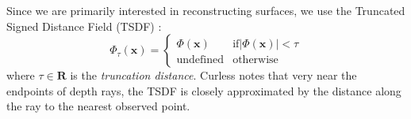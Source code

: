 \documentclass[10pt,twocolumn,letterpaper]{article}
\newcommand{\eref}[1]{(\ref{#1})}
\newcommand{\figref}[1]{Fig.\ref{#1}}
\begin{document}
Since we are primarily interested in reconstructing surfaces,
we use the Truncated Signed Distance Field (TSDF) \cite{Curless1996}:
\begin{equation}
	\Phi_{\tau}(\mathbf{x}) =
	\begin{cases}
		\Phi(\mathbf{x}) &  \text{if} |\Phi(\mathbf{x})| < \tau \\
		\text{undefined} & \text{otherwise}
	\end{cases}
\end{equation}
where $\tau \in \mathbf{R}$ is the \emph{truncation distance}.  Curless
\cite{Curless1996} notes that very near the endpoints of depth rays, the TSDF is
closely approximated by the distance along the ray to the nearest observed
point. 

% 
% 
% 
\end{document}

